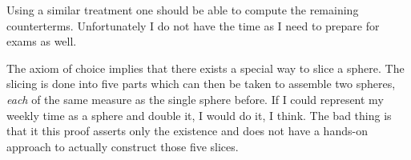 \documentclass[11pt, english, fleqn, DIV=15, headinclude]{scrartcl}
\begin{document}
Using a similar treatment one should be able to compute the remaining
counterterms. Unfortunately I do not have the time as I need to prepare for
exams as well.

The axiom of choice implies that there exists a special way to slice a sphere.
The slicing is done into five parts which can then be taken to assemble two
spheres, \emph{each} of the same measure as the single sphere before. If I
could represent my weekly time as a sphere and double it, I would do it, I
think. The bad thing is that it this proof asserts only the existence and does
not have a hands-on approach to actually construct those five slices.
\end{document}
